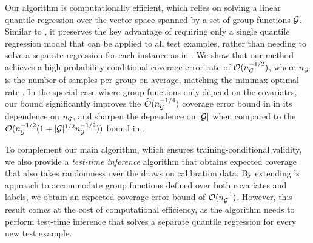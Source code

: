 Our algorithm is computationally efficient, which relies on solving a linear quantile regression over the vector space spanned by a set of group functions ${\cal G}$. Similar to \citet{JNRR2023}, it preserves the key advantage of requiring only a single quantile regression model that can be applied to all test examples, rather than needing to solve a separate regression for each instance as in \citet{GCC2023}. We show that our method achieves a high-probability conditional coverage error rate of 
$\mathcal O(n_{{\cal G}}^{-1/2})$, where $n_{{\cal G}}$ is the number of samples per group on average, matching the minimax-optimal rate \citep{ACDR24}.
In the special case where group functions only depend on the covariates,  our bound significantly improves the $\widetilde{ \mathcal  O}(n_{{\cal G}}^{-1/4})$ coverage error bound in \citet{RO22, JNRR2023} in its dependence on $n_{{\cal G}}$, and sharpen the dependence on $|{\cal G}|$  when compared to the $\mathcal O(n_{{\cal G}}^{-1/2}(1 + |{\cal G}|^{1/2}n_{{\cal G}}^{-1/2}))$ bound in \citet{ACDR24}.





To complement our main algorithm, which ensures training-conditional validity, we also provide a \emph{test-time inference} algorithm that obtains expected coverage that also takes randomness over the draws on calibration data. By extending \citet{GCC2023}’s approach to accommodate group functions defined over both covariates and labels, we obtain an expected coverage error bound of $\mathcal O(n_{{\cal G}}^{-1})$. However, this result comes at the cost of computational efficiency, as the algorithm needs to perform test-time inference that solves a separate quantile regression for every new test example.

